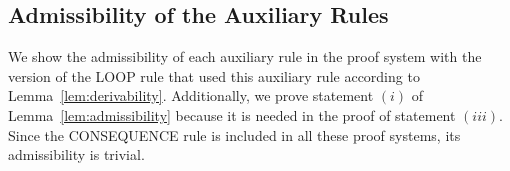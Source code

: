 \documentclass[manuscript, screen, review]{acmart}
\begin{document}





\subsection{Admissibility of the Auxiliary Rules}
\label{subsec:proof-admissibility}

We show the admissibility of each auxiliary rule in the proof system
with the version of the LOOP rule that used this auxiliary rule 
according to Lemma~\ref{lem:derivability}. 
Additionally, we prove statement $(i)$ of Lemma~\ref{lem:admissibility} 
because it is needed in the proof of statement $(iii)$.
Since the CONSEQUENCE rule is included in all these proof systems,
its admissibility is trivial.




    
   
        
   
  
   
\end{document}
